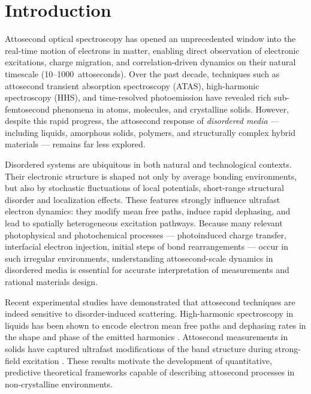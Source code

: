 \chapter{Introduction}


Attosecond optical spectroscopy has opened an unprecedented window into the real-time motion of electrons in matter, enabling direct observation of electronic excitations, charge migration, and correlation-driven dynamics on their natural timescale (10--1000~attoseconds). Over the past decade, techniques such as attosecond transient absorption spectroscopy (ATAS), high-harmonic spectroscopy (HHS), and time-resolved photoemission have revealed rich sub-femtosecond phenomena in atoms, molecules, and crystalline solids. However, despite this rapid progress, the attosecond response of \emph{disordered media} — including liquids, amorphous solids, polymers, and structurally complex hybrid materials — remains far less explored.

Disordered systems are ubiquitous in both natural and technological contexts. Their electronic structure is shaped not only by average bonding environments, but also by stochastic fluctuations of local potentials, short-range structural disorder
and localization effects. These features strongly influence ultrafast electron dynamics: they modify mean free paths, induce rapid dephasing, and lead to spatially heterogeneous excitation pathways. Because many relevant photophysical and photochemical processes — photoinduced charge transfer, interfacial electron injection, initial steps of bond rearrangements — occur in such irregular environments, understanding attosecond-scale dynamics in disordered media is essential for accurate interpretation of measurements and rational materials design.

Recent experimental studies have demonstrated that attosecond techniques are indeed sensitive to disorder-induced scattering. High-harmonic spectroscopy in liquids has been shown to encode electron mean free paths and dephasing rates in the shape and phase of the emitted harmonics \cite{Mondal2023LiquidHHS}. Attosecond measurements in solids have captured ultrafast modifications of the band structure during strong-field excitation \cite{Schultze2014Si}. These results motivate the development of quantitative, predictive theoretical frameworks capable of describing attosecond processes in non-crystalline environments.





